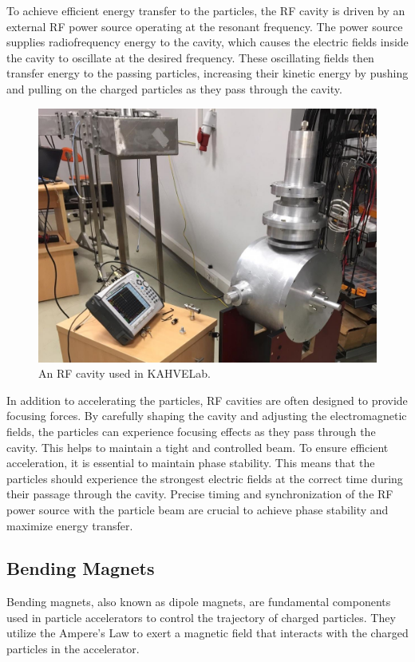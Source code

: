 \documentclass{article}
\begin{document}
To achieve efficient energy transfer to the particles, the RF cavity is driven by an external RF power source operating at the resonant frequency. 
The power source supplies radiofrequency energy to the cavity, which causes the electric fields inside the cavity to oscillate at the desired frequency. 
These oscillating fields then transfer energy to the passing particles, increasing their kinetic energy by pushing and pulling on the charged particles as they pass through the cavity. 
\newline

\begin{figure}[H]
    \centering
    \includegraphics[width=.75\textwidth]{../../../figures/pill_box.jpeg}
    \vspace{20pt}
    \caption{An RF cavity used in KAHVELab.}
\end{figure}

In addition to accelerating the particles, RF cavities are often designed to provide focusing forces. 
By carefully shaping the cavity and adjusting the electromagnetic fields, the particles can experience focusing effects as they pass through the cavity. 
This helps to maintain a tight and controlled beam. To ensure efficient acceleration, it is essential to maintain phase stability. 
This means that the particles should experience the strongest electric fields at the correct time during their passage through the cavity. 
Precise timing and synchronization of the RF power source with the particle beam are crucial to achieve phase stability and maximize energy transfer.

\subsection{Bending Magnets}
Bending magnets, also known as dipole magnets, are fundamental components used in particle accelerators to control the trajectory of charged particles. 
They utilize the Ampere's Law to exert a magnetic field that interacts with the charged particles in the accelerator. 
\end{document}
